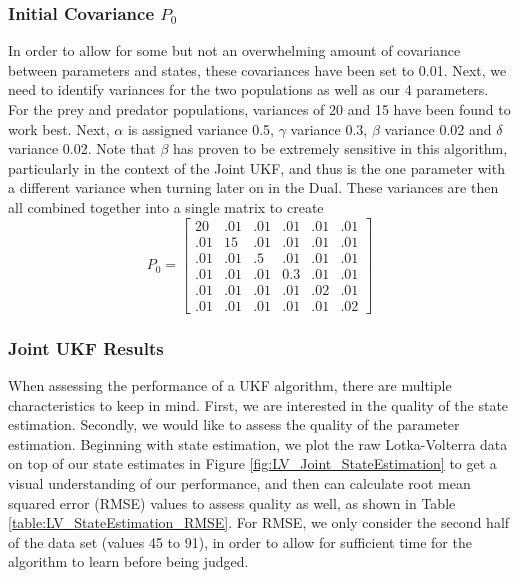 \documentclass{article}
\begin{document}
\subsubsection{Initial Covariance $P_0$}
In order to allow for some but not an overwhelming amount of covariance between parameters and states, these covariances have been set to 0.01. Next, we need to identify variances for the two populations as well as our 4 parameters. For the prey and predator populations, variances of 20 and 15 have been found to work best. Next, $\alpha$ is assigned variance 0.5, $\gamma$ variance 0.3, $\beta$ variance 0.02 and $\delta$ variance 0.02. Note that $\beta$ has proven to be extremely sensitive in this algorithm, particularly in the context of the Joint UKF, and thus is the one parameter with a different variance when turning later on in the Dual. These variances are then all combined together into a single matrix to create
\begin{equation}
P_{0} = \begin{bmatrix}
20 & .01 & .01 & .01 & .01 & .01\\
.01 & 15 & .01 & .01 & .01 & .01\\
.01 & .01 & .5 & .01 & .01 & .01\\
.01 & .01 & .01 & 0.3 & .01 & .01\\
.01 & .01 & .01 & .01  & .02 & .01\\
.01 & .01 & .01 & .01 & .01 & .02\end{bmatrix}
\end{equation}


\subsubsection{Joint UKF Results}
When assessing the performance of a UKF algorithm, there are multiple characteristics to keep in mind. First, we are interested in the quality of the state estimation. Secondly, we would like to assess the quality of the parameter estimation. Beginning with state estimation, we plot the raw Lotka-Volterra data on top of our state estimates in Figure \ref{fig:LV_Joint_StateEstimation} to get a visual understanding of our performance, and then can calculate root mean squared error (RMSE) values to assess quality as well, as shown in Table \ref{table:LV_StateEstimation_RMSE}. For RMSE, we only consider the second half of the data set (values 45 to 91), in order to allow for sufficient time for the algorithm to learn before being judged.\\ 
\end{document}

